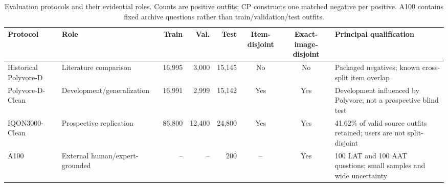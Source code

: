 \begin{table}[t]
\caption{Evaluation protocols and their evidential roles. Counts are positive outfits; CP constructs one matched negative per positive. A100 contains fixed archive questions rather than train/validation/test outfits.}
\label{tab:datasets}
\centering
\small
\begin{tabular}{l l r r r c c p{4.0cm}}
\toprule
Protocol & Role & Train & Val. & Test & Item-disjoint & Exact-image-disjoint & Principal qualification \\
\midrule
Historical Polyvore-D & Literature comparison & 16,995 & 3,000 & 15,145 & No & No & Packaged negatives; known cross-split item overlap \\
Polyvore-D-Clean & Development/generalization & 16,991 & 2,999 & 15,142 & Yes & Yes & Development influenced by Polyvore; not a prospective blind test \\
IQON3000-Clean & Prospective replication & 86,800 & 12,400 & 24,800 & Yes & Yes & 41.62\% of valid source outfits retained; users are not split-disjoint \\
A100 & External human/expert-grounded & -- & -- & 200 & -- & Yes & 100 LAT and 100 AAT questions; small samples and wide uncertainty \\
\bottomrule
\end{tabular}
\end{table}

